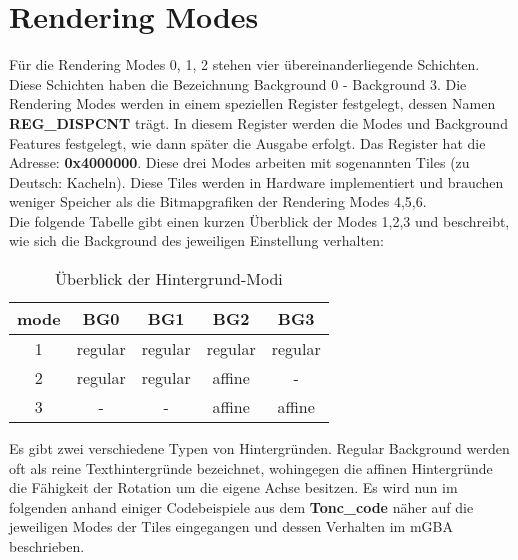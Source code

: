 \chapter{Rendering Modes}
Für die Rendering Modes 0, 1, 2 stehen vier übereinanderliegende Schichten. Diese Schichten haben die Bezeichnung Background 0 - Background 3.
Die Rendering Modes werden in einem speziellen Register festgelegt, dessen Namen \textbf{REG\_DISPCNT} trägt. In diesem Register werden die Modes und Background Features festgelegt, wie dann später die Ausgabe erfolgt.
Das Register hat die Adresse: \textbf{0x4000000}. Diese drei Modes arbeiten mit sogenannten Tiles (zu Deutsch: Kacheln). Diese Tiles werden in Hardware implementiert und brauchen weniger Speicher als die Bitmapgrafiken der Rendering Modes 4,5,6.\\
Die folgende Tabelle gibt einen kurzen Überblick der Modes 1,2,3 und beschreibt, wie sich die Background des jeweiligen Einstellung verhalten: \\
\begin{table}[h]
\centering
\begin{tabular}{|c|c|c|c|c|}
\hline
\textbf{mode} & \textbf{BG0} & \textbf{BG1} & \textbf{BG2} & \textbf{BG3} \\ \hline
1 & regular & regular & regular & regular \\ \hline
2 & regular & regular & affine & - \\ \hline
3 & - & - & affine & affine \\ \hline
\end{tabular}
\caption{Überblick der Hintergrund-Modi}
\label{Überblick der Hintergrund-Modi}
\end{table}
Es gibt zwei verschiedene Typen von Hintergründen. Regular Background werden oft als reine Texthintergründe bezeichnet, wohingegen die affinen Hintergründe die Fähigkeit der Rotation um die eigene Achse besitzen.
Es wird nun im folgenden anhand einiger Codebeispiele aus dem \textbf{Tonc\_code} näher auf die jeweiligen Modes der Tiles eingegangen und dessen Verhalten im mGBA beschrieben. \citep{mode}